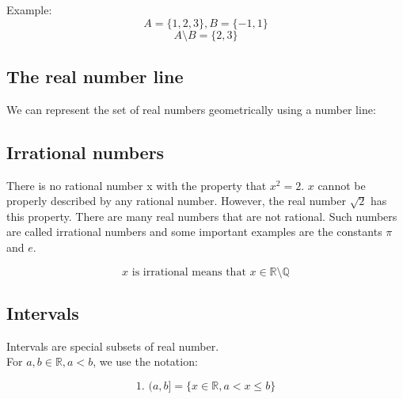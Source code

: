 \documentclass[11pt]{article}
\begin{document}
Example:
\[A = \{1, 2, 3\}, B = \{-1, 1\}\]
\[A \setminus B = \{2, 3\}\]

\subsection{The real number line}
\label{sec:orgf79aabe}
We can represent the set of real numbers geometrically using a number line:
\\[0pt]

\begin{center}
\end{center}

\subsection{Irrational numbers}
\label{sec:org3b3a6ce}
There is no rational number x with the property that \(x^2 = 2\). \(x\) cannot be properly described by any rational number. However, the real number \(\sqrt{2}\) has this property. There are many real numbers that are not rational. Such numbers are called irrational numbers and some important examples are the constants \(\pi\) and \(e\).

\[x \text{ is irrational means that } x \in \mathbb{R} \setminus \mathbb{Q}\]

\newpage

\subsection{Intervals}
\label{sec:orgcad034f}
Intervals are special subsets of real number.
\\[0pt]

For \(a, b \in \mathbb{R}, a < b\), we use the notation:

\[\text{1. } (a, b] = \{x \in \mathbb{R}, a < x \le b\}\]

\begin{center}
\end{center}
\end{document}
